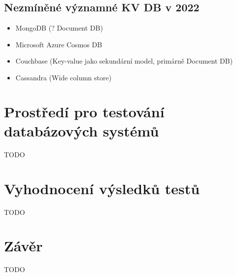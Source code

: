 \documentclass[czech,bachelor,dept460,male,csharp,cpdeclaration]{diploma}
\begin{document}
	\section {Nezmíněné významné KV DB v 2022}
		\begin{itemize}
			\item MongoDB (? Document DB)
			\item Microsoft Azure Cosmos DB
			\item Couchbase (Key-value jako sekundární model, primárně Document DB)
			\item Cassandra (Wide column store)
		\end{itemize}

	\chapter{Prostředí pro testování databázových systémů}
	
	TODO
	
	\chapter{Vyhodnocení výsledků testů}
	
	TODO
	
	\chapter{Závěr}
	
	TODO
		
	\nocite{*}
	
	\printbibliography[title={Literatura}, heading=bibintoc]
	
\end{document}
